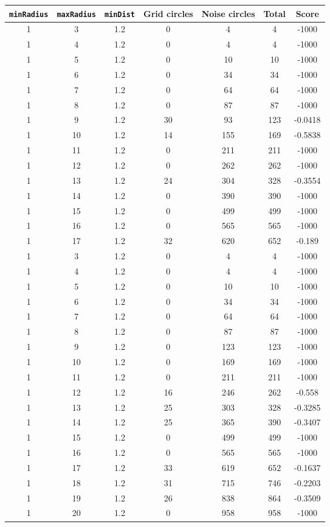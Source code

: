 \documentclass[letterpaper, 12pt]{article}
\begin{document}
\begin{longtable}{|c|c|c|c|c|c|c|}
\hline
\textbf{\texttt{minRadius}} & \textbf{\texttt{maxRadius}} & \textbf{\texttt{minDist}} & \textbf{Grid circles} & \textbf{Noise circles} & \textbf{Total} & \textbf{Score} \\
\hline
1 & 3 & 1.2 & 0 & 4 & 4 & -1000 \\
\hline
1 & 4 & 1.2 & 0 & 4 & 4 & -1000 \\
\hline
1 & 5 & 1.2 & 0 & 10 & 10 & -1000 \\
\hline
1 & 6 & 1.2 & 0 & 34 & 34 & -1000 \\
\hline
1 & 7 & 1.2 & 0 & 64 & 64 & -1000 \\
\hline
1 & 8 & 1.2 & 0 & 87 & 87 & -1000 \\
\hline
1 & 9 & 1.2 & 30 & 93 & 123 & -0.0418 \\
\hline
1 & 10 & 1.2 & 14 & 155 & 169 & -0.5838 \\
\hline
1 & 11 & 1.2 & 0 & 211 & 211 & -1000 \\
\hline
1 & 12 & 1.2 & 0 & 262 & 262 & -1000 \\
\hline
1 & 13 & 1.2 & 24 & 304 & 328 & -0.3554 \\
\hline
1 & 14 & 1.2 & 0 & 390 & 390 & -1000 \\
\hline
1 & 15 & 1.2 & 0 & 499 & 499 & -1000 \\
\hline
1 & 16 & 1.2 & 0 & 565 & 565 & -1000 \\
\hline
1 & 17 & 1.2 & 32 & 620 & 652 & -0.189 \\
\hline
1 & 3 & 1.2 & 0 & 4 & 4 & -1000 \\
\hline
1 & 4 & 1.2 & 0 & 4 & 4 & -1000 \\
\hline
1 & 5 & 1.2 & 0 & 10 & 10 & -1000 \\
\hline
1 & 6 & 1.2 & 0 & 34 & 34 & -1000 \\
\hline
1 & 7 & 1.2 & 0 & 64 & 64 & -1000 \\
\hline
1 & 8 & 1.2 & 0 & 87 & 87 & -1000 \\
\hline
1 & 9 & 1.2 & 0 & 123 & 123 & -1000 \\
\hline
1 & 10 & 1.2 & 0 & 169 & 169 & -1000 \\
\hline
1 & 11 & 1.2 & 0 & 211 & 211 & -1000 \\
\hline
1 & 12 & 1.2 & 16 & 246 & 262 & -0.558 \\
\hline
1 & 13 & 1.2 & 25 & 303 & 328 & -0.3285 \\
\hline
1 & 14 & 1.2 & 25 & 365 & 390 & -0.3407 \\
\hline
1 & 15 & 1.2 & 0 & 499 & 499 & -1000 \\
\hline
1 & 16 & 1.2 & 0 & 565 & 565 & -1000 \\
\hline
1 & 17 & 1.2 & 33 & 619 & 652 & -0.1637 \\
\hline
1 & 18 & 1.2 & 31 & 715 & 746 & -0.2203 \\
\hline
1 & 19 & 1.2 & 26 & 838 & 864 & -0.3509 \\
\hline
1 & 20 & 1.2 & 0 & 958 & 958 & -1000 \\
\hline
\end{longtable}
\end{document}
